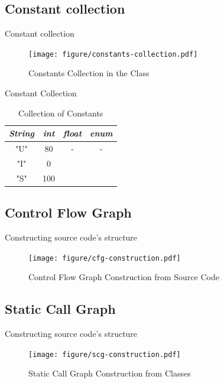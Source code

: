 \documentclass{beamer}
\begin{document}
\subsection{Constant collection}
\begin{frame}{Constant collection}
    \begin{figure}
        \texttt{[image: figure/constants-collection.pdf]}
        \caption{Constants Collection in the Class}
        \label{fig:constantsCollection}
    \end{figure}
\end{frame}

\begin{frame}{Constant Collection}
    \begin{table}
        \caption{Collection of Constants}
        \label{tab:fff}
        \begin{tabular}{cccc}
            \textit{\textbf{String}} & \textit{\textbf{int}} & \textit{\textbf{float}} & \textit{\textbf{enum}} \\ \hline \hline
            "U"     & 80    & - & - \\
            "I"     & 0     &   &   \\
            "S"     & 100   &   &   \\ \hline 
        \end{tabular}
    \end{table}
\end{frame}

\subsection{Control Flow Graph}
\begin{frame}{Constructing source code's structure}
    \begin{figure}
        \texttt{[image: figure/cfg-construction.pdf]}
        \caption{Control Flow Graph Construction from Source Code}
        \label{fig:cfgConstruct}
    \end{figure}
\end{frame}

\subsection{Static Call Graph}
\begin{frame}{Constructing source code's structure}
    \begin{figure}
        \texttt{[image: figure/scg-construction.pdf]}
        \caption{Static Call Graph Construction from Classes}
        \label{fig:scgConstruct}
    \end{figure}
\end{frame}
\end{document}
